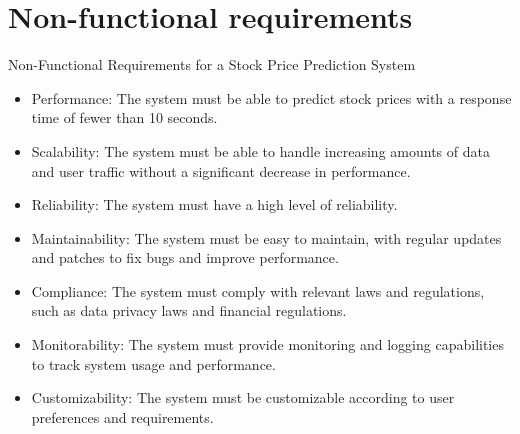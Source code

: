 \section{Non-functional requirements}
Non-Functional Requirements for a Stock Price Prediction System
\begin{itemize}
    \item Performance: The system must be able to predict stock prices with a response time of fewer than 10 seconds.
    \item Scalability: The system must be able to handle increasing amounts of data and user traffic without a significant decrease in performance.
    \item Reliability: The system must have a high level of reliability.
    \item Maintainability: The system must be easy to maintain, with regular updates and patches to fix bugs and improve performance.
    \item Compliance: The system must comply with relevant laws and regulations, such as data privacy laws and financial regulations.
    \item Monitorability: The system must provide monitoring and logging capabilities to track system usage and performance.
    \item Customizability: The system must be customizable according to user preferences and requirements.
\end{itemize} 

